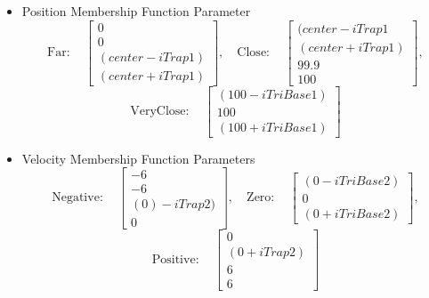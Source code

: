 \begin{itemize} \item Position Membership Function Parameter \begin{displaymath} \mathrm{Far:}\quad
\begin{bmatrix} 0\\0\\(center-iTrap1)\\(center+iTrap1) \end{bmatrix}, \quad
\mathrm{Close:}\quad \begin{bmatrix} (center-iTrap1\\(center+iTrap1)\\99.9\\100
\end{bmatrix}, \end{displaymath} \begin{displaymath} \mathrm{VeryClose:}\quad \begin{bmatrix}
(100-iTriBase1)\\100\\ (100+iTriBase1) \end{bmatrix} \end{displaymath}
 
 \item Velocity Membership Function Parameters \begin{displaymath} \mathrm{Negative:}\quad
     \begin{bmatrix} -6\\-6\\(0)-iTrap2)\\0 \end{bmatrix}, \quad \mathrm{Zero:}\quad
     \begin{bmatrix} (0-iTriBase2)\\0\\ (0+iTriBase2) \end{bmatrix}, \end{displaymath}
         \begin{displaymath} \mathrm{Positive:}\quad \begin{bmatrix} 0\\ (0+iTrap2)\\6\\6
         \end{bmatrix} \end{displaymath}
 

\end{itemize}

